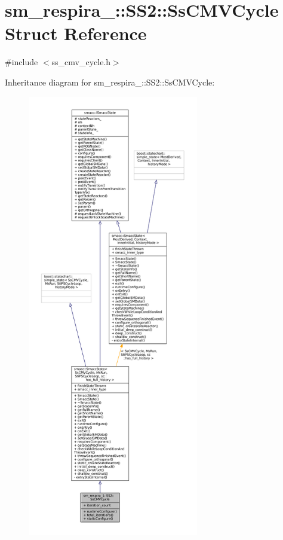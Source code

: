 \hypertarget{structsm__respira__1_1_1SS2_1_1SsCMVCycle}{}\section{sm\+\_\+respira\+\_\+:\+:S\+S2\+:\+:Ss\+C\+M\+V\+Cycle Struct Reference}
\label{structsm__respira__1_1_1SS2_1_1SsCMVCycle}


{\ttfamily \#include $<$ss\+\_\+cmv\+\_\+cycle.\+h$>$}



Inheritance diagram for sm\+\_\+respira\+\_\+:\+:S\+S2\+:\+:Ss\+C\+M\+V\+Cycle\+:
\nopagebreak
\begin{figure}[H]
\begin{center}
\leavevmode
\includegraphics[height=550pt]{structsm__respira__1_1_1SS2_1_1SsCMVCycle__inherit__graph}
\end{center}
\end{figure}


